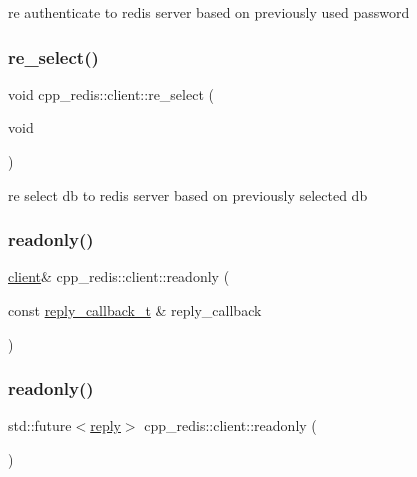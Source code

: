 re authenticate to redis server based on previously used password \mbox{\label{classcpp__redis_1_1client_abc1daa18274ff5994c88600a2c2f3c67}} 
\subsubsection{\texorpdfstring{re\+\_\+select()}{re\_select()}}
{\footnotesize\ttfamily void cpp\+\_\+redis\+::client\+::re\+\_\+select (\begin{DoxyParamCaption}\item[{void}]{ }\end{DoxyParamCaption})\hspace{0.3cm}{\ttfamily [private]}}

re select db to redis server based on previously selected db \mbox{\label{classcpp__redis_1_1client_a14353780458071311d074fd951201f93}} 
\subsubsection{\texorpdfstring{readonly()}{readonly()}\hspace{0.1cm}{\footnotesize\ttfamily [1/2]}}
{\footnotesize\ttfamily \hyperlink{classcpp__redis_1_1client}{client}\& cpp\+\_\+redis\+::client\+::readonly (\begin{DoxyParamCaption}\item[{const \hyperlink{classcpp__redis_1_1client_a061a1140d36d2eaeda82b09a0bb3f9f2}{reply\+\_\+callback\+\_\+t} \&}]{reply\+\_\+callback }\end{DoxyParamCaption})}

\mbox{\label{classcpp__redis_1_1client_acbf4ef53964a7e451793c17b9ac103ee}} 
\subsubsection{\texorpdfstring{readonly()}{readonly()}\hspace{0.1cm}{\footnotesize\ttfamily [2/2]}}
{\footnotesize\ttfamily std\+::future$<$\hyperlink{classcpp__redis_1_1reply}{reply}$>$ cpp\+\_\+redis\+::client\+::readonly (\begin{DoxyParamCaption}{ }\end{DoxyParamCaption})}

